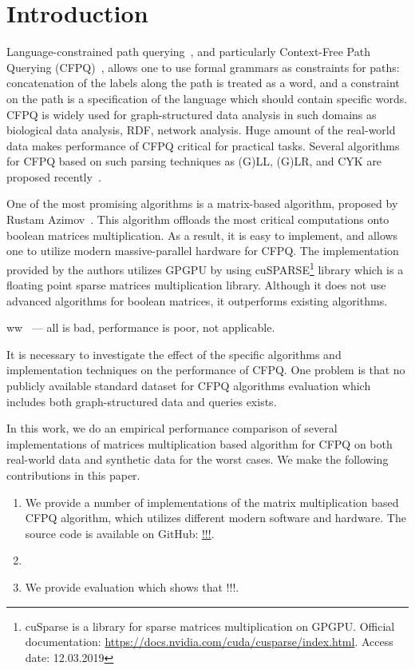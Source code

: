 \section{Introduction}

Language-constrained path querying~\cite{FLCpathProblem}, and particularly Context-Free Path Querying (CFPQ)~\cite{Yannakakis}, allows one to use formal grammars as constraints for paths: concatenation of the labels along the path is treated as a word, and a constraint on the path is a specification of the language which should contain specific words.
CFPQ is widely used for graph-structured data analysis in such domains as biological data analysis, RDF, network analysis.
Huge amount of the real-world data makes performance of CFPQ critical for practical tasks.
Several algorithms for CFPQ based on such parsing techniques as (G)LL, (G)LR, and CYK are proposed recently~\cite{hellingsPathQuerying,Grigorev:2017:CPQ:3166094.3166104,Verbitskaia:2018:PCC:3241653.3241655,RDF,10.1007/978-3-319-91662-0_17,Medeiros:2018:EEC:3167132.3167265}.

One of the most promising algorithms is a matrix-based algorithm, proposed by Rustam Azimov~\cite{Azimov:2018:CPQ:3210259.3210264}.
This algorithm offloads the most critical computations onto boolean matrices multiplication.
As a result, it is easy to implement, and allows one to utilize modern massive-parallel hardware for CFPQ.
The implementation provided by the authors utilizes GPGPU by using cuSPARSE\footnote{cuSparse is a library for sparse matrices multiplication on GPGPU. Official documentation: \url{https://docs.nvidia.com/cuda/cusparse/index.html}. Access date: 12.03.2019} library which is a floating point sparse matrices multiplication library.
Although it does not use advanced algorithms for boolean matrices, it outperforms existing algorithms.

ww~\cite{Kuijpers:2019:ESC:3335783.3335791} --- all is bad, performance is poor, not applicable.

It is necessary to investigate the effect of the specific algorithms and implementation techniques on the performance of CFPQ.
One problem is that no publicly available standard dataset for CFPQ algorithms evaluation which includes both graph-structured data and queries exists.

In this work, we do an empirical performance comparison of several implementations of matrices multiplication based algorithm for CFPQ on both real-world data and synthetic data for the worst cases.
We make the following contributions in this paper.

\begin{enumerate}
\item We provide a number of implementations of the matrix multiplication based CFPQ algorithm, which utilizes different modern software and hardware.
The source code is available on GitHub: \url{!!!}.
\item 
\item We provide evaluation which shows that !!!.
\end{enumerate}
